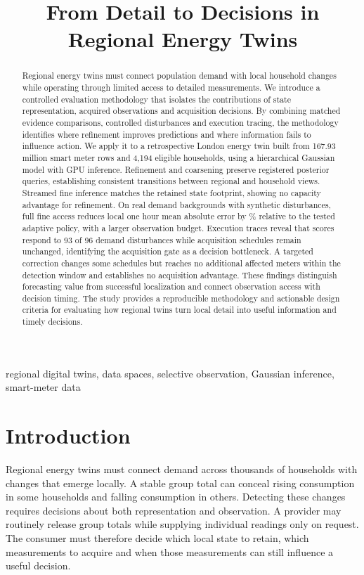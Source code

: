 \documentclass[conference]{IEEEtran}
\title{From Detail to Decisions in Regional Energy Twins}
\author{\IEEEauthorblockN{Alexander V. Mantzaris}
\IEEEauthorblockA{School of Data, Mathematical and Statistical Sciences\\
University of Central Florida\\
alexander.mantzaris@ucf.edu}}
\begin{document}
\maketitle

\begin{abstract}
Regional energy twins must connect population demand with local household changes while operating through limited access to detailed measurements. We introduce a controlled evaluation methodology that isolates the contributions of state representation, acquired observations and acquisition decisions. By combining matched evidence comparisons, controlled disturbances and execution tracing, the methodology identifies where refinement improves predictions and where information fails to influence action. We apply it to a retrospective London energy twin built from 167.93 million smart meter rows and 4,194 eligible households, using a hierarchical Gaussian model with GPU inference. Refinement and coarsening preserve registered posterior queries, establishing consistent transitions between regional and household views. Streamed fine inference matches the retained state footprint, showing no capacity advantage for refinement. On real demand backgrounds with synthetic disturbances, full fine access reduces local one hour mean absolute error by \FineGainPercent{}\% relative to the tested adaptive policy, with a larger observation budget. Execution traces reveal that scores respond to 93 of 96 demand disturbances while acquisition schedules remain unchanged, identifying the acquisition gate as a decision bottleneck. A targeted correction changes some schedules but reaches no additional affected meters within the detection window and establishes no acquisition advantage. These findings distinguish forecasting value from successful localization and connect observation access with decision timing. The study provides a reproducible methodology and actionable design criteria for evaluating how regional twins turn local detail into useful information and timely decisions.
\end{abstract}
\begin{IEEEkeywords}
regional digital twins, data spaces, selective observation, Gaussian inference, smart-meter data
\end{IEEEkeywords}




\section{Introduction}
Regional energy twins must connect demand across thousands of households with changes that emerge locally. A stable group total can conceal rising consumption in some households and falling consumption in others. Detecting these changes requires decisions about both representation and observation. A provider may routinely release group totals while supplying individual readings only on request. The consumer must therefore decide which local state to retain, which measurements to acquire and when those measurements can still influence a useful decision.
\end{document}
